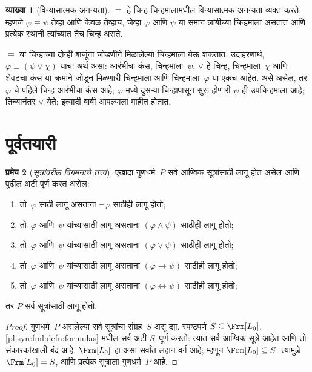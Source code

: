 \documentclass[11pt,a4paper,openany]{book}
\theoremstyle{definition}
\newtheorem{defn}{व्याख्या}[section]
\newtheorem{thm}[defn]{प्रमेय}
\newcommand{\lif}{\mathbin{\to}}
\newcommand{\liff}{\mathbin{\leftrightarrow}}
\newcommand{\ident}{\equiv}
\begin{document}
\begin{defn}[विन्यासात्मक अनन्यता]
$\ident$ हे चिन्ह चिन्हमालांमधील विन्यासात्मक अनन्यता व्यक्त करते;
म्हणजे $\varphi \ident \psi$ तेव्हा आणि केवळ तेव्हाच, जेव्हा $\varphi$ आणि $\psi$
या समान लांबीच्या चिन्हमाला असतात आणि प्रत्येक स्थानी त्यांच्यात तेच
चिन्ह असते.
\end{defn}

$\ident$ या चिन्हाच्या दोन्ही बाजूंना जोडणीने मिळालेल्या चिन्हमाला
येऊ शकतात. उदाहरणार्थ, $\varphi \ident (\psi \lor \chi)$ याचा अर्थ असा:
आरंभीचा कंस, चिन्हमाला~$\psi$, $\lor$ हे चिन्ह, चिन्हमाला~$\chi$ आणि
शेवटचा कंस या क्रमाने जोडून मिळणारी चिन्हमाला आणि चिन्हमाला~$\varphi$
या एकच आहेत. असे असेल, तर $\varphi$ चे पहिले चिन्ह आरंभीचा कंस आहे;
$\varphi$ मध्ये दुसऱ्या चिन्हापासून सुरू होणारी $\psi$ ही उपचिन्हमाला आहे;
तिच्यानंतर $\lor$ येते; इत्यादी बाबी आपल्याला माहीत होतात.









\section{पूर्वतयारी}\label{pl:syn:pre:sec}

\begin{thm}[\emph{सूत्रांवरील विगमनाचे तत्त्व}]
  \label{pl:syn:pre:thm:induction}
  एखादा गुणधर्म~$P$ सर्व आण्विक सूत्रांसाठी लागू होत असेल आणि
  पुढील अटी पूर्ण करत असेल:
  \begin{enumerate}
    \item तो~$\varphi$ साठी लागू असताना $\lnot \varphi$ साठीही
      लागू होतो;
    \item तो~$\varphi$ आणि~$\psi$ यांच्यासाठी लागू असताना
      $(\varphi \land \psi)$ साठीही लागू होतो;
    \item तो~$\varphi$ आणि~$\psi$ यांच्यासाठी लागू असताना
      $(\varphi \lor \psi)$ साठीही लागू होतो;
    \item तो~$\varphi$ आणि~$\psi$ यांच्यासाठी लागू असताना
      $(\varphi \lif \psi)$ साठीही लागू होतो;
    \item तो~$\varphi$ आणि~$\psi$ यांच्यासाठी लागू असताना
      $(\varphi \liff \psi)$ साठीही लागू होतो;
  \end{enumerate}
  तर $P$ सर्व सूत्रांसाठी लागू होतो.
\end{thm}

\begin{proof}
  गुणधर्म~$P$ असलेल्या सर्व सूत्रांचा संग्रह~$S$ असू द्या.
  स्पष्टपणे $S \subseteq \Frm[L_0]$. \ref{pl:syn:fml:defn:formulas} मधील
  सर्व अटी $S$~पूर्ण करतो: त्यात सर्व आण्विक सूत्रे आहेत आणि
  तो संकारकांखाली बंद आहे.  $\Frm[L_0]$ हा असा सर्वांत लहान
  वर्ग आहे; म्हणून $\Frm[L_0] \subseteq S$. त्यामुळे $\Frm[L_0] = S$,
  आणि प्रत्येक सूत्राला गुणधर्म~$P$ आहे.
\end{proof}
\end{document}
